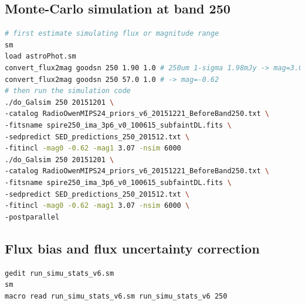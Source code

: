 \documentclass[11pt,a4paper]{article}
\begin{document}
\subsection{Monte-Carlo simulation at band 250}
\label{Band250_Galsim}

\begin{lstlisting}[language=bash]
# first estimate simulating flux or magnitude range
sm
load astroPhot.sm 
convert_flux2mag goodsn 250 1.90 1.0 # 250um 1-sigma 1.98mJy -> mag=3.069
convert_flux2mag goodsn 250 57.0 1.0 # -> mag=-0.62
# then run the simulation code
./do_Galsim 250 20151201 \
-catalog RadioOwenMIPS24_priors_v6_20151221_BeforeBand250.txt \
-fitsname spire250_ima_3p6_v0_100615_subfaintDL.fits \
-sedpredict SED_predictions_250_201512.txt \
-fitincl -mag0 -0.62 -mag1 3.07 -nsim 6000 
./do_Galsim 250 20151201 \
-catalog RadioOwenMIPS24_priors_v6_20151221_BeforeBand250.txt \
-fitsname spire250_ima_3p6_v0_100615_subfaintDL.fits \
-sedpredict SED_predictions_250_201512.txt \
-fitincl -mag0 -0.62 -mag1 3.07 -nsim 6000 \
-postparallel
\end{lstlisting}

\subsection{Flux bias and flux uncertainty correction}
\label{Band250_dfcorr}

\begin{lstlisting}[language=bash]
gedit run_simu_stats_v6.sm
sm
macro read run_simu_stats_v6.sm run_simu_stats_v6 250
\end{lstlisting}
\end{document}
